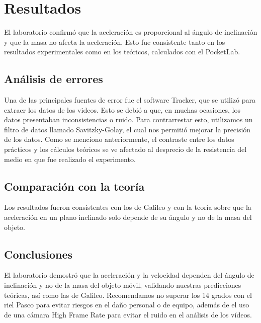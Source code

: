 \documentclass[twocolumn,12pt]{article}
\begin{document}
    \twocolumn
    
    \section{Resultados}
    
    El laboratorio confirmó que la aceleración es proporcional al ángulo de inclinación y que la masa no afecta la aceleración. Esto fue consistente tanto en los resultados experimentales como en los teóricos, calculados con el PocketLab.
    
    
    \subsection{Análisis de errores}
    Una de las principales fuentes de error fue el software Tracker, que se utilizó para extraer los datos de los videos. Esto se debió a que, en muchas ocasiones, los datos presentaban inconsistencias o ruido. Para contrarrestar esto, utilizamos un filtro de datos llamado Savitzky-Golay, el cual nos permitió mejorar la precisión de los datos. Como se menciono anteriormente, el contraste entre los datos prácticos y los cálculos teóricos se ve afectado al desprecio de la resistencia del medio en que fue realizado el experimento.
    
    \subsection{Comparación con la teoría}
    Los resultados fueron consistentes con los de Galileo y con la teoría sobre que la aceleración en un plano inclinado solo depende de su ángulo y no de la masa del objeto.
    
    \subsection{Conclusiones}

    El laboratorio demostró que la aceleración y la velocidad dependen del ángulo de inclinación y no de la masa del objeto móvil, validando nuestras predicciones teóricas, así como las de Galileo. Recomendamos no superar los 14 grados con el riel Pasco para evitar riesgos en el daño personal o de equipo, además de el uso de una cámara High Frame Rate para evitar el ruido en el análisis de los vídeos.
    
\end{document}
